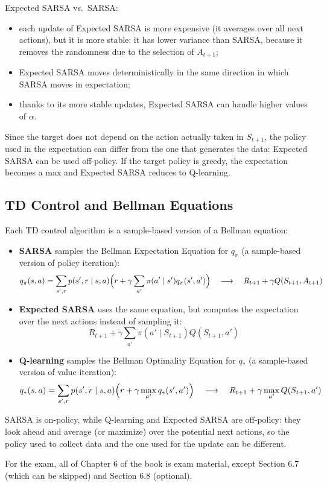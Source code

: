 Expected SARSA vs.\ SARSA:
\begin{itemize}
    \item each update of Expected SARSA is more expensive (it averages over all next actions), but it is more stable: it has lower variance than SARSA, because it removes the randomness due to the selection of $A_{t+1}$;
    \item Expected SARSA moves deterministically in the same direction in which SARSA moves in expectation;
    \item thanks to its more stable updates, Expected SARSA can handle higher values of $\alpha$.
\end{itemize}
Since the target does not depend on the action actually taken in $S_{t+1}$, the policy used in the expectation can differ from the one that generates the data: Expected SARSA can be used off-policy. If the target policy is greedy, the expectation becomes a max and Expected SARSA reduces to Q-learning.

\subsection{TD Control and Bellman Equations}
Each TD control algorithm is a sample-based version of a Bellman equation:
\begin{itemize}
    \item \textbf{SARSA} samples the Bellman Expectation Equation for $q_\pi$ (a sample-based version of policy iteration):
    \[q_\pi(s,a)=\sum_{s',r}p(s',r\mid s,a)\Bigl(r+\gamma\sum_{a'}\pi(a'\mid s')q_\pi(s',a')\Bigr)\quad\longrightarrow\quad R_{t+1}+\gamma Q(S_{t+1},A_{t+1})\]
    \item \textbf{Expected SARSA} uses the same equation, but computes the expectation over the next actions instead of sampling it:
    \[R_{t+1}+\gamma\sum_{a'}\pi(a'\mid S_{t+1})Q(S_{t+1},a')\]
    \item \textbf{Q-learning} samples the Bellman Optimality Equation for $q_*$ (a sample-based version of value iteration):
    \[q_*(s,a)=\sum_{s',r}p(s',r\mid s,a)\Bigl(r+\gamma\max_{a'}q_*(s',a')\Bigr)\quad\longrightarrow\quad R_{t+1}+\gamma\max_{a'}Q(S_{t+1},a')\]
\end{itemize}
SARSA is on-policy, while Q-learning and Expected SARSA are off-policy: they look ahead and average (or maximize) over the potential next actions, so the policy used to collect data and the one used for the update can be different.

For the exam, all of Chapter 6 of the book is exam material, except Section 6.7 (which can be skipped) and Section 6.8 (optional).
